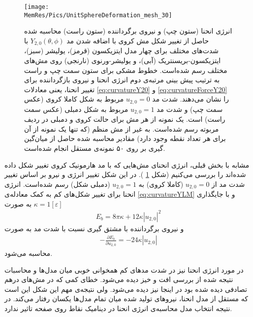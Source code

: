 \begin{figure}[htbp]
\begin{center}
\texttt{[image: \\MemRes/Pics/UnitSphereDeformation\_mesh\_30]}
\caption{
انرژی انحنا (ستون چپ) و نیروی برگرداننده (ستون راست) محاسبه‌ شده حاصل از تغییر شکل مش کروی با اضافه شدن مد
$Y_{2,0}(\theta,\phi)$
با شدت‌های مختلف برای چهار مدل ایتزیکسون (قرمز)، یولیشر (سبز)، ایتزیکسون-بریسنتریک (آبی)، و یولیشر-ورنوی (نارنجی) روی مش‌های مختلف رسم شده‌است. خطوط مشکی برای ستون سمت چپ و راست به ترتیب پیش بینی
 مرتبه‌ی دوم انرژی انحنا و نیروی بازگرداننده برای تغییر انحنا، یعنی معادلات
\ref{eq:curvatureY20}
و
\ref{eq:curvatureForceY20}
را نشان می‌دهند.  شدت مد 
$u_{2,0}=0$
مربوط به شکل کاملا کروی (عکس سمت چپ) و شدت مد 
$u_{2,0}=1$
مربوط به شکل دمبلی (عکس سمت راست) است. یک نمونه از هر مش برای حالت کروی و دمبلی در ردیف مربوته رسم شده‌است. به غیر از مش منظم (که تنها یک نمونه از آن برای هر تعداد نقطه وجود دارد) مقادیر محاسبه شده حاصل از میان‌گین گیری بر روی ۵۰ نمونه‌ی مستقل انجام شده‌است.
}
\label{fig:unitsphereBendingULM20}
\end{center}
\end{figure}

مشابه با بخش قبلی، انرژی انحنای مش‌هایی که با مد هارمونیک کروی تغییر شکل داده شده‌اند را بررسی می‌کنیم (شکل
\ref{fig:unitsphereBendingULM20}
). در این شکل تغییر انرژی و نیرو بر اساس تغییر شدت مد از
$u_{2,0}=0$
(کاملا کروی) به
$u_{2,0}=1$
(دمبلی شکل) رسم شده‌است. انرژی انحنا برای تغییر شکل‌های کم به کمک معادله‌ی 
\ref{eq:curvatureYLM}
 و با جایگذاری 
 $\kappa=1[\varepsilon]$
 به صورت
\begin{eqnarray}
E_{b}=8\pi\kappa + 12\kappa|u_{2,0}|^2
\label{eq:curvatureY20}
\end{eqnarray}
و نیروی برگرداننده با مشتق گیری نسبت با شدت مد به صورت
\begin{eqnarray}
-\frac{\partial E_{b}}{\partial u_{2,0}}= -24\kappa |u_{2,0}|
\label{eq:curvatureForceY20}
\end{eqnarray}
محاسبه می‌شود.

در مورد انرژی انحنا نیز در شد‌ت مدهای کم همخوانی خوبی میان مدل‌ها و محاسبات نتیجه شده از بررسی افت و خیز دیده می‌شود. خطای کمی که در مش‌های درهم تصادفی دیده‌ شده بود در اینجا نیز دیده می‌شود. ولی نتیجه‌ی مهم این شکل این است که مستقل از مدل انحنا، نیروهای تولید شده میان تمام مدل‌ها یکسان رفتار می‌کند. در نتیجه انتخاب مدل محاسبه‌ی انرژی انحنا در دینامیک نقاط روی صفحه تاثیر ندارد.

